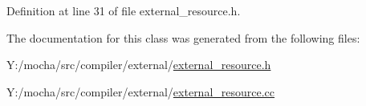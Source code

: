 Definition at line 31 of file external\_\-resource.h.



The documentation for this class was generated from the following files:\begin{DoxyCompactItemize}
\item 
Y:/mocha/src/compiler/external/\hyperlink{external__resource_8h}{external\_\-resource.h}\item 
Y:/mocha/src/compiler/external/\hyperlink{external__resource_8cc}{external\_\-resource.cc}\end{DoxyCompactItemize}
